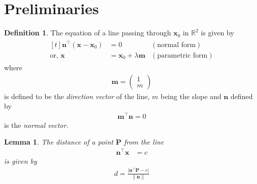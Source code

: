 \documentclass[]{interact}
\theoremstyle{plain}%
\newtheorem{lemma}[theorem]{Lemma}
\theoremstyle{definition}
\newtheorem{definition}[theorem]{Definition}
\theoremstyle{remark}
\providecommand{\abs}[1]{\lvert#1\rvert}
\providecommand{\brak}[1]{\ensuremath{\left(#1\right)}}
\providecommand{\norm}[1]{\left\lVert#1\right\rVert}
\newcommand{\myvec}[1]{\ensuremath{\begin{pmatrix}#1\end{pmatrix}}}
\let\vec\mathbf
\begin{document}
\section{Preliminaries}
\begin{definition}
  The equation of a line passing through $\vec{x}_0$ in $\mathbb{R}^2$ is given by 
  \begin{align}
    \label{eq:line_norm_eq}
    \begin{aligned}[t]
  \vec{n}^{\top}\brak{\vec{x}-\vec{x}_0}&=0  &\brak{\text{normal form}}
  \\
  \text{or, } \vec{x}&=\vec{x}_0 + \lambda \vec{m}  & \brak{\text{parametric form}}
    \end{aligned}
\end{align}
%
where 
\begin{align}
  \vec{m} = \myvec{1 \\m}
\end{align}
is defined to be the {\em direction vector} of the line, $m$ being the slope and $\vec{n}$ defined by 
\begin{align}
  \vec{m}^{\top}\vec{n} = 0
  \label{eq:line_dir_norm}
\end{align}
%
is the {\em normal vector}.
\end{definition}
\begin{lemma}
  \label{conics/30/lemma}
  The distance of a point $\vec{P}$ from the line 
  \begin{align}
      \vec{n}^{\top}\vec{x}&=c  
\end{align}
is given by 
  \begin{align}
  d = \frac{\abs{\vec{n}^{\top}\vec{P}-c}}{\norm{\vec{n}}}   
  \end{align}
  \end{lemma}
\end{document}
